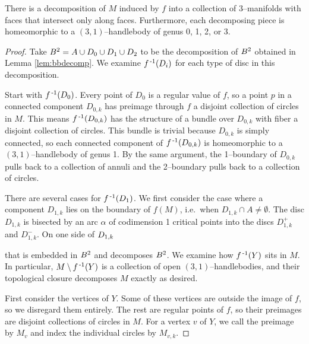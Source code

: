 \begin{lem}
	\label{lem:3bodydecomp}
	There is a decomposition of $M$ induced by $f$
	into a collection of 3--manifolds with faces that intersect only along faces.
	Furthermore, each decomposing piece is homeomorphic to a $(3,1)$--handlebody of genus 0, 1, 2, or 3.
\end{lem}

\begin{proof}
	Take $B^2=A\cup D_0\cup D_1\cup D_2$ to be the decomposition of $B^2$ obtained in Lemma \ref{lem:bbdecomp}.
	We examine $f^{\,\text{-}1}(D_i)$ for each type of disc in this decomposition.
	
	Start with $f^{\,\text{-}1}(D_0)$.
	Every point of $D_0$ is a regular value of $f$, so a point $p$ in a connected component $D_{0,k}$ has preimage through $f$ a disjoint collection of circles in $M$.
	This means $f^{\,\text{-}1}(D_{0,k})$ has the structure of a bundle over $D_{0,k}$ with fiber a disjoint collection of circles.
	This bundle is trivial because $D_{0,k}$ is simply connected, so each connected component of $f^{\,\text{-}1}(D_{0,k})$ is homeomorphic to a $(3,1)$--handlebody of genus 1.
	By the same argument, the 1--boundary of $D_{0,k}$ pulls back to a collection of annuli and the 2--boundary pulls back to a collection of circles.
	
	There are several cases for $f^{\,\text{-}1}(D_1)$.
	We first consider the case where a component $D_{1,k}$ lies on the boundary of $f(M)$, i.e.\ when $D_{1,k}\cap A\neq\emptyset$.
	The disc $D_{1,k}$ is bisected by an arc $\alpha$ of codimension 1 critical points into the discs $D_{1,k}^+$ and $D_{1,k}^-$.
	On one side of $D_{1,k}$

	
	
	
	 that is embedded in $B^2$ and decomposes $B^2$.
	We examine how $f^{\,\text{-}1}(Y)$ sits in $M$.
	In particular, $M\setminus f^{\,\text{-}1}(Y)$ is a collection of open $(3,1)$--handlebodies, and their topological closure decomposes $M$ exactly as desired.
	
	First consider the vertices of $Y$.
	Some of these vertices are outside the image of $f$, so we disregard them entirely.
	The rest are regular points of $f$, so their preimages are disjoint collections of circles in $M$.
	For a vertex $v$ of $Y$, we call the preimage by $M_v$ and index the individual circles by $M_{v,k}$.
	

\end{proof}
